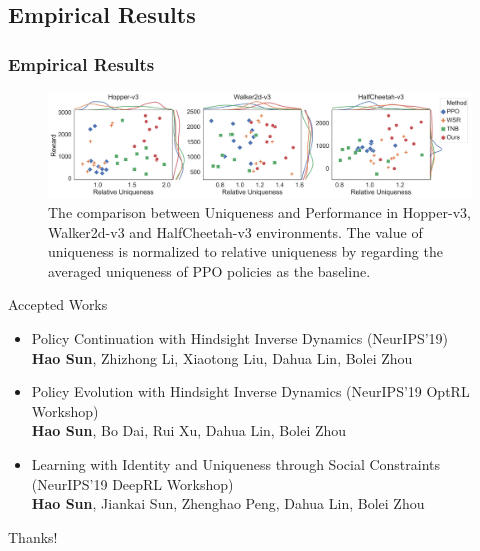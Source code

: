 \documentclass[10pt,hyperref={CJKbookmarks=true},envcountsect,mathserif]{beamer}
\begin{document}
\subsection{Empirical Results}
\begin{frame}
	\frametitle{Empirical Results}
	\begin{figure}[t]
\includegraphics[width=\linewidth]{figures/v8.pdf}
\caption{The comparison between Uniqueness and Performance in Hopper-v3, Walker2d-v3 and HalfCheetah-v3 environments. The value of uniqueness is normalized to relative uniqueness by regarding the averaged uniqueness of PPO policies as the baseline.}


\label{fig_novelty}
\end{figure}
\end{frame}

\begin{frame}{Accepted Works}

\begin{itemize}
\item Policy Continuation with Hindsight Inverse Dynamics (NeurIPS'19) \\
 \textbf{Hao Sun}, Zhizhong Li, Xiaotong Liu, Dahua Lin, Bolei Zhou

\item Policy Evolution with Hindsight Inverse Dynamics (NeurIPS'19 OptRL Workshop)\\
 \textbf{Hao Sun}, Bo Dai, Rui Xu, Dahua Lin, Bolei Zhou

\item Learning with Identity and Uniqueness through Social Constraints (NeurIPS'19 DeepRL Workshop)\\
 \textbf{Hao Sun}, Jiankai Sun, Zhenghao Peng, Dahua Lin, Bolei Zhou

\end{itemize}
\huge{\centerline{Thanks!}}
\end{frame}
\end{document}
